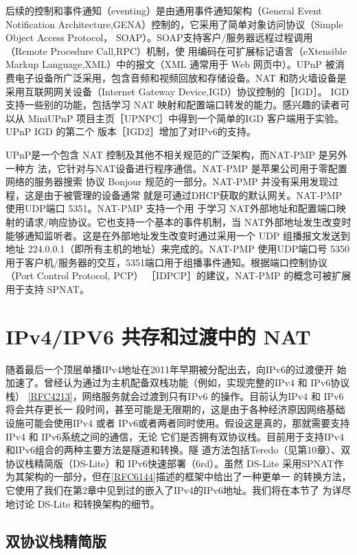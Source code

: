 后续的控制和事件通知（eventing）是由通用事件通知架构（General Event Notification
Architecture,GENA）控制的，它采用了简单对象访问协议（Simple Object Access Protocol，
SOAP）。SOAP支持客户/服务器远程过程调用（Remote Procedure Call,RPC）机制，使
用编码在可扩展标记语言（eXtensible Markup Language,XML）中的报文（XML 通常用于
Web 网页中）。UPnP 被消费电子设备所广泛采用，包含音频和视频回放和存储设备。NAT
和防火墙设备是采用互联网网关设备（Internet Gateway Device,IGD）协议控制的［IGD］。
IGD 支持一些别的功能，包括学习 NAT 映射和配置端口转发的能力。感兴趣的读者可以从
MiniUPnP 项目主页［UPNPC］中得到一个简单的IGD 客户端用于实验。UPnP IGD 的第二个
版本［IGD2］增加了对IPv6的支持。

UPnP是一个包含 NAT 控制及其他不相关规范的广泛架构，而NAT-PMP 是另外一种方
法，它针对与NAT设备进行程序通信。NAT-PMP 是苹果公司用于零配置网络的服务器搜索
协议 Bonjour 规范的一部分。NAT-PMP 并没有采用发现过程，这是由于被管理的设备通常
就是可通过DHCP获取的默认网关。NAT-PMP 使用UDP端口 5351。NAT-PMP 支持一个用
于学习 NAT外部地址和配置端口映射的请求/响应协议。它也支持一个基本的事件机制，当
NAT外部地址发生改变时能够通知监听者。这是在外部地址发生改变时通过采用一个 UDP
组播报文发送到地址 224.0.0.1（即所有主机的地址）来完成的。NAT-PMP 使用UDP端口号
5350用于客户机/服务器的交互，5351端口用于组播事件通知。根据端口控制协议（Port
Control Protocol, PCP） ［IDPCP］的建议，NAT-PMP 的概念可被扩展用于支持 SPNAT。

\section{IPv4/IPV6 共存和过渡中的 NAT}

随着最后一个顶层单播IPv4地址在2011年早期被分配出去，向IPv6的过渡便开
始加速了。曾经认为通过为主机配备双栈功能（例如，实现完整的IPv4 和 IPv6协议栈）
\href{https://www.rfc-editor.org/rfc/rfc4213}{[RFC4213]}，网络服务就会过渡到只有IPv6 的操作。目前认为IPv4 和 IPv6将会共存更长一
段时间，甚至可能是无限期的，这是由于各种经济原因网络基础设施可能会使用IPv4 或者
IPv6或者两者同时使用。假设这是真的，那就需要支持IPv4 和 IPv6系统之间的通信，无论
它们是否拥有双协议栈。目前用于支持IPv4和IPv6组合的两种主要方法是隧道和转换。隧
道方法包括Teredo（见第10章）、双协议栈精简版（DS-Lite）和 IPv6快速部署（6rd）。虽然
DS-Lite 采用SPNAT作为其架构的一部分，但在\href{https://www.rfc-editor.org/rfc/rfc6144}{[RFC6144]}描述的框架中给出了一种更单一
的转换方法，它使用了我们在第2章中见到过的嵌入了IPv4的IPv6地址。我们将在本节了
为详尽地讨论 DS-Lite 和转换架构的细节。

\subsection{双协议栈精简版}

